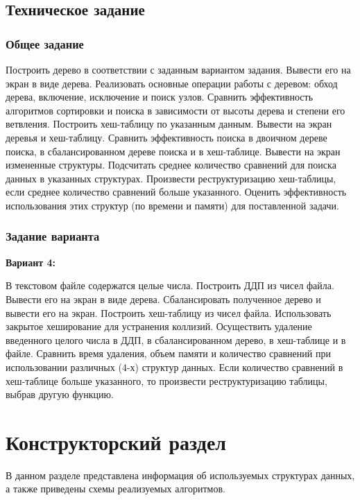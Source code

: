 \section{Техническое задание}

\subsection{Общее задание}

Построить дерево в соответствии с заданным вариантом задания. Вывести его 
на  экран  в  виде  дерева.  Реализовать  основные  операции  работы  с  деревом:  обход 
дерева, включение, исключение и поиск узлов. Сравнить эффективность алгоритмов 
сортировки  и  поиска  в  зависимости  от  высоты  дерева  и  степени  его  ветвления. 
Построить  хеш-таблицу  по  указанным  данным.  Вывести  на  экран  деревья  и  хеш-таблицу.  Сравнить  эффективность  поиска  в  двоичном  дереве  поиска,  в 
сбалансированном  дереве  поиска  и  в  хеш-таблице.  Вывести  на  экран  измененные 
структуры.  Подсчитать  среднее  количество  сравнений  для  поиска  данных  в 
указанных  структурах.  Произвести  реструктуризацию  хеш-таблицы,  если  среднее 
количество  сравнений  больше  указанного.  Оценить  эффективность  использования 
этих структур (по времени и памяти) для поставленной задачи.

\subsection{Задание варианта}

\textbf{Вариант 4:}

В текстовом файле содержатся целые числа. Построить ДДП из чисел файла. 
Вывести его на экран в виде дерева. Сбалансировать полученное дерево и 
вывести его на экран. Построить хеш-таблицу из чисел файла. Использовать 
закрытое  хеширование  для  устранения  коллизий.  Осуществить  удаление 
введенного целого числа в ДДП, в сбалансированном дерево, в хеш-таблице и в 
файле. Сравнить время удаления, объем памяти и количество сравнений при 
использовании различных (4-х) структур данных. Если количество сравнений в 
хеш-таблице  больше  указанного,  то  произвести  реструктуризацию  таблицы, 
выбрав другую функцию.

\chapter{Конструкторский раздел}

В данном разделе представлена информация об используемых структурах данных, а также приведены схемы реализуемых алгоритмов.

